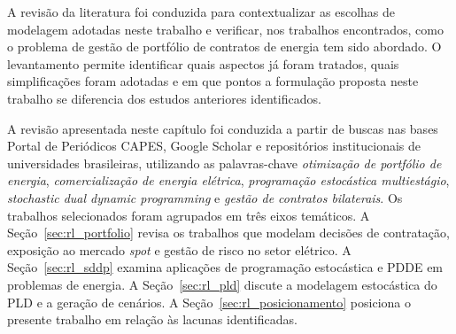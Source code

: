 A revisão da literatura foi conduzida para contextualizar as escolhas de modelagem
adotadas neste trabalho e verificar, nos trabalhos encontrados, como o problema de
gestão de portfólio de contratos de energia tem sido abordado. O levantamento
permite identificar quais aspectos já foram tratados, quais simplificações foram
adotadas e em que pontos a formulação proposta neste trabalho se diferencia dos
estudos anteriores identificados.

A revisão apresentada neste capítulo foi conduzida a partir de buscas nas bases Portal de Periódicos CAPES, Google Scholar e repositórios institucionais de universidades brasileiras, utilizando as palavras-chave \emph{otimização de portfólio de energia}, \emph{comercialização de energia elétrica}, \emph{programação estocástica multiestágio}, \emph{stochastic dual dynamic programming} e \emph{gestão de contratos bilaterais}. Os trabalhos selecionados foram agrupados em três eixos temáticos. A Seção~\ref{sec:rl_portfolio} revisa os trabalhos que modelam decisões de contratação, exposição ao mercado \emph{spot} e gestão de risco no setor elétrico. A Seção~\ref{sec:rl_sddp} examina aplicações de programação estocástica e PDDE em problemas de energia. A Seção~\ref{sec:rl_pld} discute a modelagem estocástica do PLD e a geração de cenários. A Seção~\ref{sec:rl_posicionamento} posiciona o presente trabalho em relação às lacunas identificadas.








